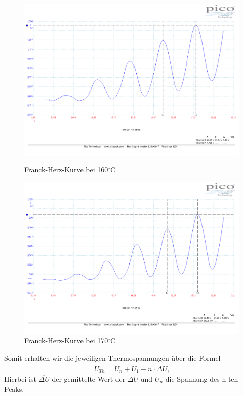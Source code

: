 \begin{figure}
	\includegraphics[width=\textwidth]{../Daten/Aufgabe1/Frank_Hertz_160.pdf}
	\caption{Franck-Herz-Kurve bei 160$ ^\circ $C}
	\includegraphics[width=\textwidth]{../Daten/Aufgabe1/Frank_Hertz_170.pdf}
	\caption{Franck-Herz-Kurve bei 170$ ^\circ $C}
\end{figure}
Somit erhalten wir die jeweiligen Thermospannungen über die Formel
\begin{align*}
U_{Th}=U_{n}+U_{1}-n\cdot \overline{\Delta U}\text{,}
\end{align*}
Hierbei ist $ \overline{\Delta U} $ der gemittelte Wert der $ \Delta U $ und $ U_{n} $ die Spannung des n-ten Peaks.

